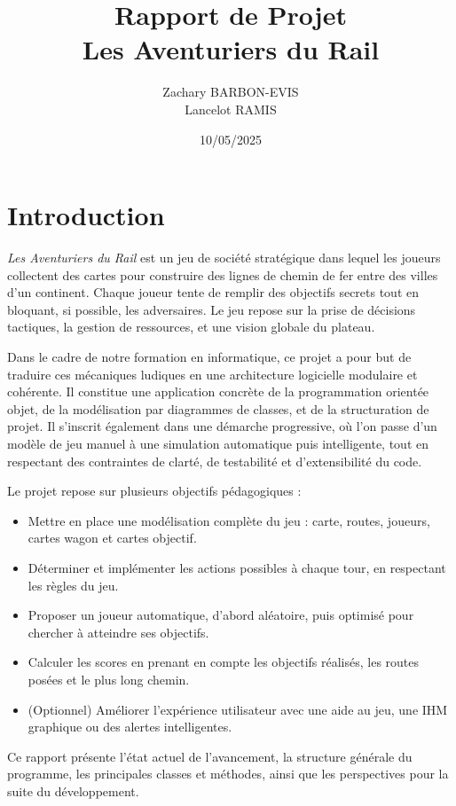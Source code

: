 \documentclass[a4paper,12pt]{report}
\title{Rapport de Projet \\ \textbf{Les Aventuriers du Rail}}
\author{Zachary BARBON-EVIS \\ Lancelot RAMIS}
\date{10/05/2025}
\begin{document}
\maketitle
\tableofcontents

\chapter*{Introduction}

\textit{Les Aventuriers du Rail} est un jeu de société stratégique dans lequel les joueurs collectent des cartes pour
construire des lignes de chemin de fer entre des villes d’un continent. Chaque joueur tente de remplir des objectifs
secrets tout en bloquant, si possible, les adversaires. Le jeu repose sur la prise de décisions tactiques,
la gestion de ressources, et une vision globale du plateau.

Dans le cadre de notre formation en informatique, ce projet a pour but de traduire ces mécaniques ludiques en une
architecture logicielle modulaire et cohérente. Il constitue une application concrète de la programmation orientée objet,
de la modélisation par diagrammes de classes, et de la structuration de projet.
Il s’inscrit également dans une démarche progressive, où l’on passe d’un modèle de jeu manuel à une simulation
automatique puis intelligente, tout en respectant des contraintes de clarté, de testabilité et d’extensibilité du code.

Le projet repose sur plusieurs objectifs pédagogiques :
\begin{itemize}
    \item Mettre en place une modélisation complète du jeu : carte, routes, joueurs, cartes wagon et cartes objectif.
    \item Déterminer et implémenter les actions possibles à chaque tour, en respectant les règles du jeu.
    \item Proposer un joueur automatique, d’abord aléatoire, puis optimisé pour chercher à atteindre ses objectifs.
    \item Calculer les scores en prenant en compte les objectifs réalisés, les routes posées et le plus long chemin.
    \item (Optionnel) Améliorer l'expérience utilisateur avec une aide au jeu, une IHM graphique ou des alertes intelligentes.
\end{itemize}

Ce rapport présente l’état actuel de l’avancement, la structure générale du programme, les principales classes et méthodes,
ainsi que les perspectives pour la suite du développement.
\end{document}
